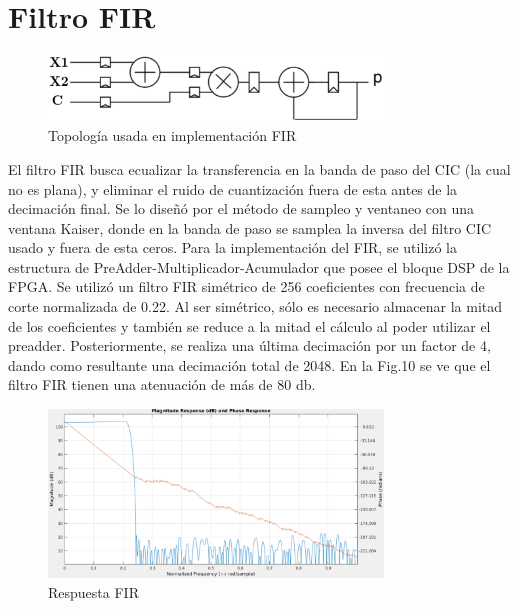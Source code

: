 \documentclass[a4paper,conference]{IEEEtran}
\begin{document}
\section{Filtro FIR}

\begin{figure}[!b]
\centering
\includegraphics[width=3.5in]{FIR_Topologia}
\caption{Topolog\'ia usada en implementaci\'on FIR}
\label{fig_9}
\end{figure}

El filtro FIR busca ecualizar la transferencia en la banda de paso del CIC (la cual no es plana), y eliminar el ruido de cuantizaci\'on fuera de esta antes de la decimaci\'on final. Se lo dise\~n\'o por el m\'etodo de sampleo y ventaneo con una ventana Kaiser, donde en la banda de paso se samplea la inversa del filtro CIC usado y fuera de esta ceros. 
Para la implementación del FIR, se utiliz\'o la estructura de PreAdder-Multiplicador-Acumulador que posee el bloque DSP de la FPGA. Se utiliz\'o un filtro FIR sim\'etrico de 256 coeficientes  con frecuencia de corte normalizada de 0.22. Al ser sim\'etrico, s\'olo es necesario almacenar la mitad de los coeficientes y tambi\'en se reduce a la mitad el c\'alculo al poder utilizar el preadder.  Posteriormente, se realiza una \'ultima decimaci\'on por un factor de 4, dando como resultante una decimaci\'on total de 2048.
En la Fig.10 se ve que el filtro FIR tienen una atenuaci\'on de más de 80 db.


\begin{figure}[!t]
\centering
\includegraphics[width=3.5in]{Respuesta_FIR}
\caption{Respuesta FIR}
\label{fig_10}
\end{figure}
\end{document}
